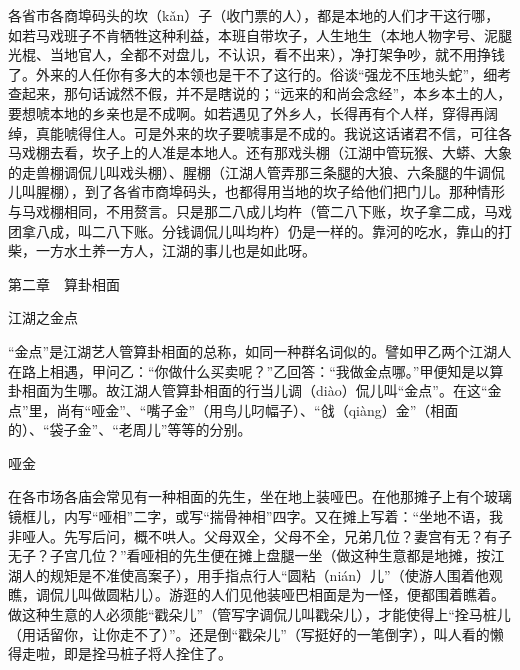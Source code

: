 \documentclass[12pt,UTF8]{ctexbook}
\begin{document}
各省市各商埠码头的坎（kǎn）子（收门票的人），都是本地的人们才干这行哪，如若马戏班子不肯牺牲这种利益，本班自带坎子，人生地生（本地人物字号、泥腿光棍、当地官人，全都不对盘儿，不认识，看不出来），净打架争吵，就不用挣钱了。外来的人任你有多大的本领也是干不了这行的。俗谈“强龙不压地头蛇”，细考查起来，那句话诚然不假，并不是瞎说的；“远来的和尚会念经”，本乡本土的人，要想唬本地的乡亲也是不成啊。如若遇见了外乡人，长得再有个人样，穿得再阔绰，真能唬得住人。可是外来的坎子要唬事是不成的。我说这话诸君不信，可往各马戏棚去看，坎子上的人准是本地人。还有那戏头棚（江湖中管玩猴、大蟒、大象的走兽棚调侃儿叫戏头棚）、腥棚（江湖人管弄那三条腿的大狼、六条腿的牛调侃儿叫腥棚），到了各省市商埠码头，也都得用当地的坎子给他们把门儿。那种情形与马戏棚相同，不用赘言。只是那二八成儿均杵（管二八下账，坎子拿二成，马戏团拿八成，叫二八下账。分钱调侃儿叫均杵）仍是一样的。靠河的吃水，靠山的打柴，一方水土养一方人，江湖的事儿也是如此呀。





第二章　算卦相面


江湖之金点


“金点”是江湖艺人管算卦相面的总称，如同一种群名词似的。譬如甲乙两个江湖人在路上相遇，甲问乙：“你做什么买卖呢？”乙回答：“我做金点哪。”甲便知是以算卦相面为生哪。故江湖人管算卦相面的行当儿调（diào）侃儿叫“金点”。在这“金点”里，尚有“哑金”、“嘴子金”（用鸟儿叼幅子）、“戗（qiàng）金”（相面的）、“袋子金”、“老周儿”等等的分别。





哑金


在各市场各庙会常见有一种相面的先生，坐在地上装哑巴。在他那摊子上有个玻璃镜框儿，内写“哑相”二字，或写“揣骨神相”四字。又在摊上写着：“坐地不语，我非哑人。先写后问，概不哄人。父母双全，父母不全，兄弟几位？妻宫有无？有子无子？子宫几位？”看哑相的先生便在摊上盘腿一坐（做这种生意都是地摊，按江湖人的规矩是不准使高案子），用手指点行人“圆粘（nián）儿”（使游人围着他观瞧，调侃儿叫做圆粘儿）。游逛的人们见他装哑巴相面是为一怪，便都围着瞧着。做这种生意的人必须能“戳朵儿”（管写字调侃儿叫戳朵儿），才能使得上“拴马桩儿（用话留你，让你走不了）”。还是倒“戳朵儿”（写挺好的一笔倒字），叫人看的懒得走啦，即是拴马桩子将人拴住了。
\end{document}
